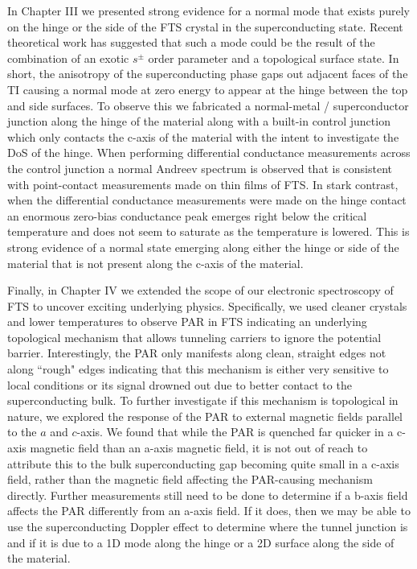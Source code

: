 In Chapter III we presented strong evidence for a normal mode that exists purely on the hinge or the side of the \ac{FTS} crystal in the superconducting state. Recent theoretical work has suggested that such a mode could be the result of the combination of an exotic $s^{\pm}$ order parameter and a topological surface state. In short, the anisotropy of the superconducting phase gaps out adjacent faces of the \ac{TI} causing a normal mode at zero energy to appear at the hinge between the top and side surfaces. To observe this we fabricated a normal-metal / superconductor junction along the hinge of the material along with a built-in control junction which only contacts the c-axis of the material with the intent to investigate the \ac{DoS} of the hinge. When performing differential conductance measurements across the control junction a normal Andreev spectrum is observed that is consistent with point-contact measurements made on thin films of \ac{FTS}. In stark contrast, when the differential conductance measurements were made on the hinge contact an enormous zero-bias conductance peak emerges right below the critical temperature and does not seem to saturate as the temperature is lowered. This is strong evidence of a normal state emerging along either the hinge or side of the material that is not present along the c-axis of the material.\par
Finally, in Chapter IV we extended the scope of our electronic spectroscopy of \ac{FTS} to uncover exciting underlying physics. Specifically, we used cleaner crystals and lower temperatures to observe \acl{PAR} in \ac{FTS} indicating an underlying topological mechanism that allows tunneling carriers to ignore the potential barrier. Interestingly, the \ac{PAR} only manifests along clean, straight edges not along ``rough" edges indicating that this mechanism is either very sensitive to local conditions or its signal drowned out due to better contact to the superconducting bulk. To further investigate if this mechanism is topological in nature, we explored the response of the \ac{PAR} to external magnetic fields parallel to the $a$ and $c$-axis. We found that while the \ac{PAR} is quenched far quicker in a c-axis magnetic field than an a-axis magnetic field, it is not out of reach to attribute this to the bulk superconducting gap becoming quite small in a c-axis field, rather than the magnetic field affecting the \ac{PAR}-causing mechanism directly. Further measurements still need to be done to determine if a b-axis field affects the \ac{PAR} differently from an a-axis field. If it does, then we may be able to use the superconducting Doppler effect to determine where the tunnel junction is and if it is due to a 1D mode along the hinge or a 2D surface along the side of the material.

